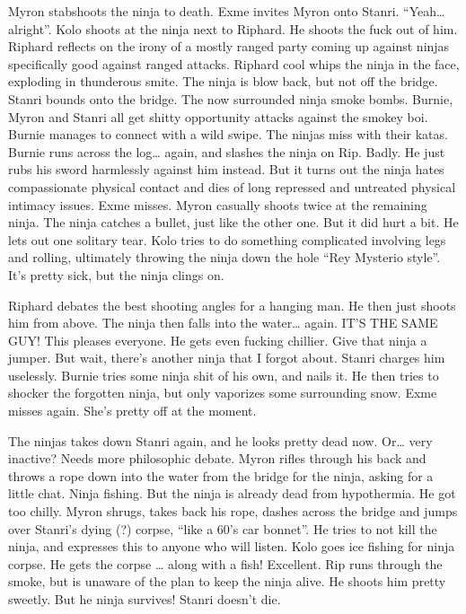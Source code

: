 Myron stabshoots the ninja to death. Exme invites Myron onto Stanri. “Yeah… alright”. Kolo shoots at the ninja next to Riphard. He shoots the fuck out of him. Riphard reflects on the irony of a mostly ranged party coming up against ninjas specifically good against ranged attacks. Riphard cool whips the ninja in the face, exploding in thunderous smite. The ninja is blow back, but not off the bridge. Stanri bounds onto the bridge. The now surrounded ninja smoke bombs. Burnie, Myron and Stanri all get shitty opportunity attacks against the smokey boi. Burnie manages to connect with a wild swipe. The ninjas miss with their katas. Burnie runs across the log… again, and slashes the ninja on Rip. Badly. He just rubs his sword harmlessly against him instead. But it turns out the ninja hates compassionate physical contact and dies of long repressed and untreated physical intimacy issues. Exme misses. Myron casually shoots twice at the remaining ninja. The ninja catches a bullet, just like the other one. But it did hurt a bit. He lets out one solitary tear. Kolo tries to do something complicated involving legs and rolling, ultimately throwing the ninja down the hole “Rey Mysterio style”. It’s pretty sick, but the ninja clings on.\medskip

Riphard debates the best shooting angles for a hanging man. He then just shoots him from above. The ninja then falls into the water… again. IT’S THE SAME GUY! This pleases everyone. He gets even fucking chillier. Give that ninja a jumper. But wait, there’s another ninja that I forgot about. Stanri charges him uselessly. Burnie tries some ninja shit of his own, and nails it. He then tries to shocker the forgotten ninja, but only vaporizes some surrounding snow. Exme misses again. She’s pretty off at the moment.\medskip

The ninjas takes down Stanri again, and he looks pretty dead now. Or… very inactive? Needs more philosophic debate. Myron rifles through his back and throws a rope down into the water from the bridge for the ninja, asking for a little chat. Ninja fishing. But the ninja is already dead from hypothermia. He got too chilly. Myron shrugs, takes back his rope, dashes across the bridge and jumps over Stanri’s dying (?) corpse, “like a 60’s car bonnet”. He tries to not kill the ninja, and expresses this to anyone who will listen. Kolo goes ice fishing for ninja corpse. He gets the corpse … along with a fish! Excellent. Rip runs through the smoke, but is unaware of the plan to keep the ninja alive. He shoots him pretty sweetly. But he ninja survives! Stanri doesn’t die.\medskip

